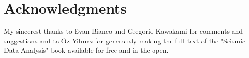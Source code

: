 \section{Acknowledgments}

My sincerest thanks to Evan Bianco and Gregorio Kawakami for comments and
suggestions and to Öz Yilmaz for generously making the full text of the
"Seismic Data Analysis" book available for free and in the open.
